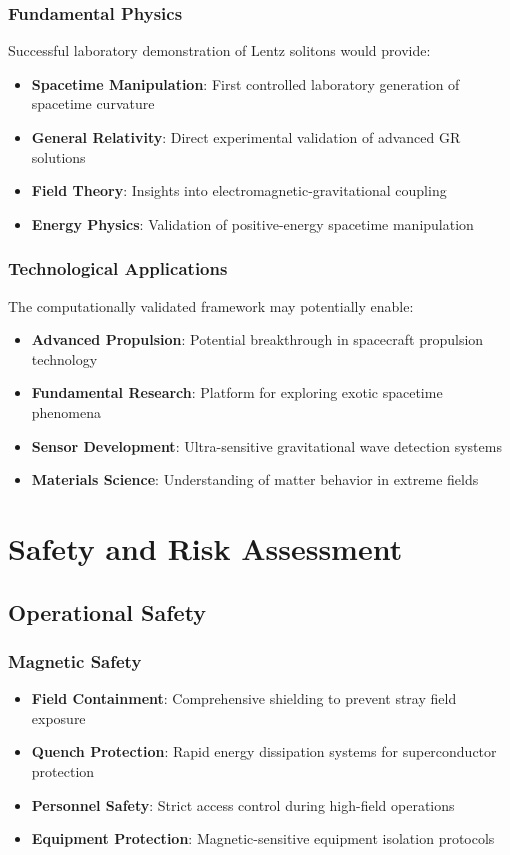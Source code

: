 \documentclass[12pt,a4paper]{article}
\begin{document}
\subsubsection{Fundamental Physics}
Successful laboratory demonstration of Lentz solitons would provide:
\begin{itemize}
\item \textbf{Spacetime Manipulation}: First controlled laboratory generation of spacetime curvature
\item \textbf{General Relativity}: Direct experimental validation of advanced GR solutions
\item \textbf{Field Theory}: Insights into electromagnetic-gravitational coupling
\item \textbf{Energy Physics}: Validation of positive-energy spacetime manipulation
\end{itemize}

\subsubsection{Technological Applications}
The computationally validated framework may potentially enable:
\begin{itemize}
\item \textbf{Advanced Propulsion}: Potential breakthrough in spacecraft propulsion technology
\item \textbf{Fundamental Research}: Platform for exploring exotic spacetime phenomena
\item \textbf{Sensor Development}: Ultra-sensitive gravitational wave detection systems
\item \textbf{Materials Science}: Understanding of matter behavior in extreme fields
\end{itemize}

\section{Safety and Risk Assessment}

\subsection{Operational Safety}

\subsubsection{Magnetic Safety}
\begin{itemize}
\item \textbf{Field Containment}: Comprehensive shielding to prevent stray field exposure
\item \textbf{Quench Protection}: Rapid energy dissipation systems for superconductor protection
\item \textbf{Personnel Safety}: Strict access control during high-field operations
\item \textbf{Equipment Protection}: Magnetic-sensitive equipment isolation protocols
\end{itemize}
\end{document}
